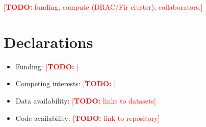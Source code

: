 \documentclass[pdflatex,sn-mathphys-ay]{sn-jnl}
\newcommand{\todo}[1]{\textcolor{red}{[\textbf{TODO:} #1]}}
\begin{document}
\backmatter

\todo{funding, compute (DRAC/Fir cluster), collaborators.}

\section*{Declarations}
\begin{itemize}
  \item Funding: \todo{}
  \item Competing interests: \todo{}
  \item Data availability: \todo{links to datasets}
  \item Code availability: \todo{link to repository}
\end{itemize}


\end{document}
